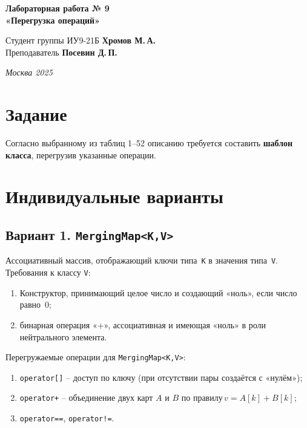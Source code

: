 \documentclass[a4paper, 14pt]{extarticle}
\begin{document}
\begin{titlepage}
\vspace{11em}
\begin{center}
  \Large\bfseries Лабораторная работа № 9\\[1ex]
  \large «Перегрузка операций»
\end{center}

\vspace{8em}
\begin{flushright}
  Студент группы ИУ9-21Б \textbf{Хромов М.\,А.}\\[2ex]
  Преподаватель \textbf{Посевин Д.\,П.}
\end{flushright}

\vfill
\begin{center}
  \textsl{Москва 2025}
\end{center}
\end{titlepage}

\section{Задание}\label{sect:task}
Согласно выбранному из таблиц 1–52 описанию требуется составить \textbf{шаблон класса}, перегрузив указанные операции.

\section{Индивидуальные варианты}\label{sect:variant}
\subsection*{Вариант 1. \texttt{MergingMap<K,V>}}
Ассоциативный массив, отображающий ключи типа~\lstinline|K| в значения типа~\lstinline|V|.  
Требования к классу \lstinline|V|:
\begin{enumerate}[nosep]
  \item Конструктор, принимающий целое число и создающий «ноль», если число равно~0;
  \item бинарная операция «+», ассоциативная и имеющая «ноль» в роли нейтрального элемента.
\end{enumerate}

Перегружаемые операции для \lstinline|MergingMap<K,V>|:
\begin{enumerate}[nosep]
  \item \lstinline|operator[]| – доступ по ключу (при отсутствии пары создаётся с «нулём»);
  \item \lstinline|operator+| – объединение двух карт $A$ и $B$ по правилу $v=A[k]+B[k]$;
  \item \lstinline|operator==|, \lstinline|operator!=|.
\end{enumerate}
\end{document}

